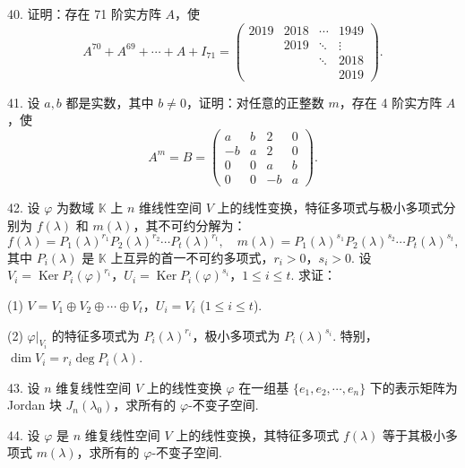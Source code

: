\documentclass[UTF8,12pt,a4paper,fontset=fandol]{ctexart}
\begin{document}
40. 证明：存在 71 阶实方阵 $A$，使
\[
A^{70}+A^{69}+\cdots+A+I_{71}=\left(\begin{array}{ccccc}
2019 & 2018 & \cdots & 1949\\
& 2019 & \ddots & \vdots\\
& & \ddots & 2018\\
& & & 2019
\end{array}\right).
\]

41. 设 $a,b$ 都是实数，其中 $b\ne 0$，证明：对任意的正整数 $m$，存在 4 阶实方阵 $A$，使
\[
A^m=B=\left(\begin{array}{rrrr}
a & b & 2 & 0\\
-b & a & 2 & 0\\
0 & 0 & a & b\\
0 & 0 & -b & a
\end{array}\right).
\]

42. 设 $\varphi$ 为数域 $\mathbb K$ 上 $n$ 维线性空间 $V$ 上的线性变换，特征多项式与极小多项式分别为 $f(\lambda)$ 和 $m(\lambda)$，其不可约分解为：
\[
f(\lambda)=P_1(\lambda)^{r_1}P_2(\lambda)^{r_2}\cdots P_t(\lambda)^{r_t},\quad
m(\lambda)=P_1(\lambda)^{s_1}P_2(\lambda)^{s_2}\cdots P_t(\lambda)^{s_t},
\]
其中 $P_i(\lambda)$ 是 $\mathbb K$ 上互异的首一不可约多项式，$r_i>0$，$s_i>0$. 设 $V_i=\operatorname{Ker}P_i(\varphi)^{r_i}$，$U_i=\operatorname{Ker}P_i(\varphi)^{s_i}$，$1\leq i\leq t$. 求证：

(1) $V=V_1\oplus V_2\oplus\cdots\oplus V_t$，$U_i=V_i$ ($1\leq i\leq t$).

(2) $\varphi|_{V_i}$ 的特征多项式为 $P_i(\lambda)^{r_i}$，极小多项式为 $P_i(\lambda)^{s_i}$. 特别，$\dim V_i=r_i\deg P_i(\lambda)$.

43. 设 $n$ 维复线性空间 $V$ 上的线性变换 $\varphi$ 在一组基 $\{e_1,e_2,\cdots,e_n\}$ 下的表示矩阵为 Jordan 块 $J_n(\lambda_0)$，求所有的 $\varphi$-不变子空间.

44. 设 $\varphi$ 是 $n$ 维复线性空间 $V$ 上的线性变换，其特征多项式 $f(\lambda)$ 等于其极小多项式 $m(\lambda)$，求所有的 $\varphi$-不变子空间.
\end{document}
